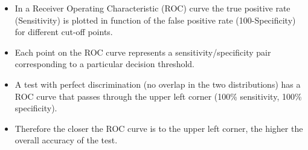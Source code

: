 \documentclass[]{report}
\begin{document}
%
%
\begin{itemize}
	\item In a Receiver Operating Characteristic (ROC) curve the true positive rate
	(Sensitivity) is plotted in function of the false positive rate (100-Specificity)
	for different cut-off points. 
	\item Each point on the ROC curve represents a sensitivity/specificity
	pair corresponding to a particular decision threshold. 
	\item A
	test with perfect discrimination (no overlap in the two distributions) has a
	ROC curve that passes through the upper left corner (100\% sensitivity, 100\%
	specificity). 
	\item Therefore the closer the ROC curve is to the upper left corner,
	the higher the overall accuracy of the test. %
\end{itemize}
\end{document}
